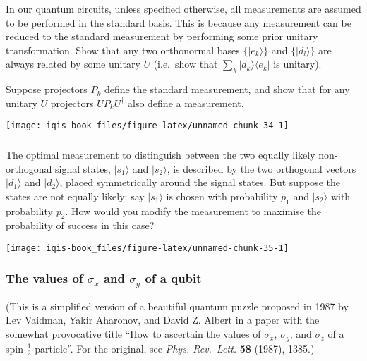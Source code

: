\documentclass[fleqn]{article}
\begin{document}
In our quantum circuits, unless specified otherwise, all measurements are assumed to be performed in the standard basis.
This is because any measurement can be reduced to the standard measurement by performing some prior unitary transformation.
Show that any two orthonormal bases \(\{|e_k\rangle\}\) and \(\{|d_l\rangle\}\) are always related by some unitary \(U\) (i.e.~show that \(\sum_k |d_k\rangle\langle e_k|\) is unitary).

Suppose projectors \(P_k\) define the standard measurement, and show that for any unitary \(U\) projectors \(UP_kU^\dagger\) also define a measurement.

\begin{center}\texttt{[image: iqis-book\_files/figure-latex/unnamed-chunk-34-1]} \end{center}

\hypertarget{section-27}{%
\subsubsection{}\label{section-27}}

The optimal measurement to distinguish between the two equally likely non-orthogonal signal states, \(|s_1\rangle\) and \(|s_2\rangle\), is described by the two orthogonal vectors \(|d_1\rangle\) and \(|d_2\rangle\), placed symmetrically around the signal states.
But suppose the states are not equally likely: say \(|s_1\rangle\) is chosen with probability \(p_1\) and \(|s_2\rangle\) with probability \(p_2\).
How would you modify the measurement to maximise the probability of success in this case?

\begin{center}\texttt{[image: iqis-book\_files/figure-latex/unnamed-chunk-35-1]} \end{center}

\hypertarget{the-values-of-sigma_x-and-sigma_y-of-a-qubit}{%
\subsubsection{\texorpdfstring{The values of \(\sigma_x\) and \(\sigma_y\) of a qubit}{The values of \textbackslash sigma\_x and \textbackslash sigma\_y of a qubit}}\label{the-values-of-sigma_x-and-sigma_y-of-a-qubit}}

(This is a simplified version of a beautiful quantum puzzle proposed in 1987 by Lev Vaidman, Yakir Aharonov, and David Z. Albert in a paper with the somewhat provocative title ``How to ascertain the values of \(\sigma_x\), \(\sigma_y\), and \(\sigma_z\) of a spin-\(\frac12\) particle''. For the original, see \emph{Phys. Rev.~Lett.} \textbf{58} (1987), 1385.)
\end{document}
